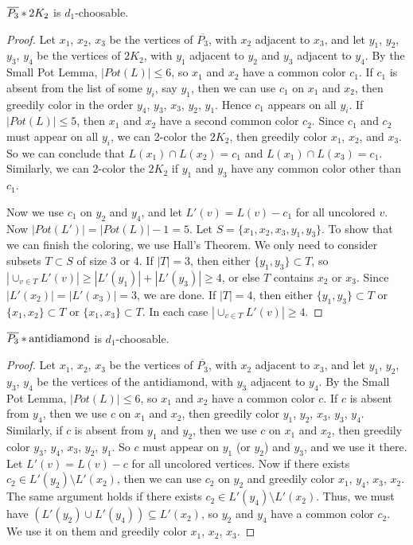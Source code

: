 \begin{lem}\label{AntiP3Join2K2}
$\overline{P_3} \mbox{\hspace{2 pt}$\ast$\hspace{2 pt}} 2K_2$ is $d_1$-choosable.
\end{lem}
\begin{proof}
Let $x_1$, $x_2$, $x_3$ be the vertices of $\overline{P_3}$, with $x_2$ adjacent
to $x_3$, and let $y_1$, $y_2$, $y_3$, $y_4$ be the vertices of $2K_2$, with
$y_1$ adjacent to $y_2$ and $y_3$ adjacent to $y_4$.  By the Small Pot Lemma,
$|Pot(L)|\le 6$, so $x_1$ and $x_2$ have a common color $c_1$.  If $c_1$ is
absent from the list of some $y_i$, say $y_1$, then we can use $c_1$ on $x_1$
and $x_2$, then greedily color in the order $y_4$, $y_3$, $x_3$, $y_2$, $y_1$.
Hence $c_1$ appears on all $y_i$.  If $|Pot(L)|\le 5$, then $x_1$ and $x_2$ have
a second common color $c_2$.  Since $c_1$ and $c_2$ must appear on all $y_i$, we
can 2-color the $2K_2$, then greedily color $x_1$, $x_2$, and $x_3$.  So we can
conclude that $L(x_1)\cap L(x_2)=c_1$ and $L(x_1)\cap L(x_3)=c_1$.  Similarly,
we can 2-color the $2K_2$ if $y_1$ and $y_3$ have any common color other than $c_1$.

Now we use $c_1$ on $y_2$ and $y_4$, and let $L'(v)=L(v)-c_1$ for all uncolored
$v$.  Now $|Pot(L')|=|Pot(L)|-1=5$. Let $S=\{x_1,x_2,x_3,y_1,y_3\}$.  To show
that we can finish the coloring, we use Hall's Theorem.  We only need to
consider subsets $T\subset S$ of size 3 or 4.  If $|T|=3$, then either
$\{y_1,y_3\}\subset T$, so $|\cup_{v\in T}L'(v)|\ge |L'(y_1)|+|L'(y_3)|\ge 4$,
or else $T$ contains $x_2$ or $x_3$.  Since $|L'(x_2)|=|L'(x_3)|=3$, we are
done.  If $|T|=4$, then either $\{y_1,y_3\}\subset T$ or $\{x_1,x_2\}\subset T$
or  $\{x_1,x_3\}\subset T$.  In each case $|\cup_{v\in T}L'(v)|\ge 4$.
\end{proof}

\begin{lem}\label{AntiP3JoinAntiDiamond}
$\overline{P_3} \mbox{\hspace{2 pt}$\ast$\hspace{2 pt}} \text{antidiamond}$ is $d_1$-choosable.
\end{lem}
\begin{proof}
Let $x_1$, $x_2$, $x_3$ be the vertices of $\overline{P_3}$, with $x_2$ adjacent
to $x_3$, and let $y_1$, $y_2$, $y_3$, $y_4$ be the vertices of the
$\text{antidiamond}$, with $y_3$ adjacent to $y_4$.  By the Small Pot Lemma,
$|Pot(L)|\le 6$, so $x_1$ and $x_2$ have a common color $c$.   If $c$ is absent
from $y_4$, then we use $c$ on $x_1$ and $x_2$, then greedily color $y_1$,
$y_2$, $x_3$, $y_3$, $y_4$.  Similarly, if $c$ is absent from $y_1$ and $y_2$,
then we use $c$ on $x_1$ and $x_2$, then greedily color $y_3$, $y_4$, $x_3$,
$y_2$, $y_1$.  So $c$ must appear on $y_1$ (or $y_2$) and $y_3$, and we use it
there.  Let $L'(v)=L(v)-c$ for all uncolored vertices.  Now if there exists
$c_2\in L'(y_2)\setminus L'(x_2)$, then we can use $c_2$ on $y_2$ and greedily
color $x_1$, $y_4$, $x_3$, $x_2$.  The same argument holds if there exists
$c_2\in L'(y_4)\setminus L'(x_2)$.  Thus, we must have $(L'(y_2)\cup
L'(y_4))\subseteq L'(x_2)$, so $y_2$ and $y_4$ have a common color $c_2$.  We
use it on them and greedily color $x_1$, $x_2$, $x_3$.
\end{proof}

